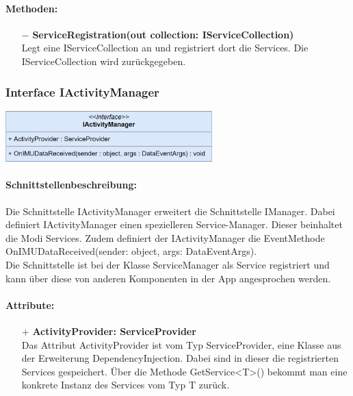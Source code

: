\documentclass[a4paper,12pt]{article}
\begin{document}
	\paragraph{Methoden:}
	\begin{itemize}
		\item[$-$] \textbf{ServiceRegistration(out collection: IServiceCollection)}\\Legt eine IServiceCollection an und registriert dort die Services. Die IServiceCollection wird zurückgegeben.
	\end{itemize}
	
	
	\begin{minipage}[b]{0.5\textwidth}
		\subsubsection{Interface IActivityManager}
	\end{minipage}
	\begin{minipage}[c]{0.5\textwidth}
		\includegraphics[width=0.6\textwidth]{bilder/EMKlassen/IActivityManagerInterface.png}
	\end{minipage}
	
	\paragraph{Schnittstellenbeschreibung:}
	Die Schnittstelle IActivityManager erweitert die Schnittstelle IManager. Dabei definiert IActivityManager einen spezielleren Service-Manager. Dieser beinhaltet die Modi Services. Zudem definiert der IActivityManager die EventMethode OnIMUDataReceived(sender: object, args: DataEventArgs).\\
	Die Schnittstelle ist bei der Klasse ServiceManager als Service registriert und kann über diese von anderen Komponenten in der App angesprochen werden.
	
	\paragraph{Attribute:}
	\begin{itemize}
		\item[+] \textbf{ActivityProvider: ServiceProvider}\\Das Attribut ActivityProvider ist vom Typ ServiceProvider, eine Klasse aus der Erweiterung \Gls{DependencyInjection}. Dabei sind in dieser die registrierten Services gespeichert. Über die Methode GetService<T>() bekommt man eine konkrete Instanz des Services vom Typ T zurück. 
	\end{itemize}
	
\end{document}

